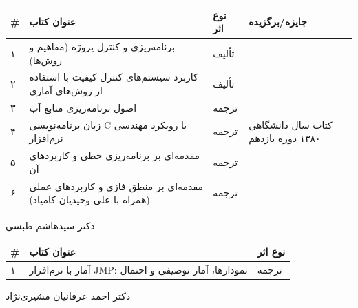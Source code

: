 \documentclass[
  letterpaper,
  DIV=11,
  numbers=noendperiod]{scrreprt}
\newcounter{none} %
\begin{document}
{\def\LTcaptype{none} %
\begin{longtable}[]{@{}
  >{\raggedright\arraybackslash}p{}
  >{\raggedright\arraybackslash}p{}
  >{\raggedright\arraybackslash}p{}
  >{\raggedright\arraybackslash}p{}@{}}
\toprule\noalign{}
\begin{minipage}[b]{\linewidth}\raggedright
\#
\end{minipage} & \begin{minipage}[b]{\linewidth}\raggedright
عنوان کتاب
\end{minipage} & \begin{minipage}[b]{\linewidth}\raggedright
نوع اثر
\end{minipage} & \begin{minipage}[b]{\linewidth}\raggedright
جایزه/برگزیده
\end{minipage} \\
\midrule\noalign{}
\endhead
\bottomrule\noalign{}
\endlastfoot
۱ & برنامه‌ریزی و کنترل پروژه (مفاهیم و روش‌ها) & تألیف & \\
۲ & کاربرد سیستم‌های کنترل کیفیت با استفاده از روش‌های آماری & تألیف & \\
۳ & اصول برنامه‌ریزی منابع آب & ترجمه & \\
۴ & زبان برنامه‌نویسی C با رویکرد مهندسی نرم‌افزار & ترجمه & کتاب سال
دانشگاهی ۱۳۸۰ دوره یازدهم \\
۵ & مقدمه‌ای بر برنامه‌ریزی خطی و کاربردهای آن & ترجمه & \\
۶ & مقدمه‌ای بر منطق فازی و کاربردهای عملی (همراه با علی وحیدیان کامیاد)
& ترجمه & \\
\end{longtable}
}

دکتر سیدهاشم طبسی

{\def\LTcaptype{none} %
\begin{longtable}[]{@{}lll@{}}
\toprule\noalign{}
\# & عنوان کتاب & نوع اثر \\
\midrule\noalign{}
\endhead
\bottomrule\noalign{}
\endlastfoot
۱ & آمار با نرم‌افزار JMP: نمودارها، آمار توصیفی و احتمال & ترجمه \\
\end{longtable}
}

دکتر احمد عرفانیان مشیری‌نژاد
\end{document}
